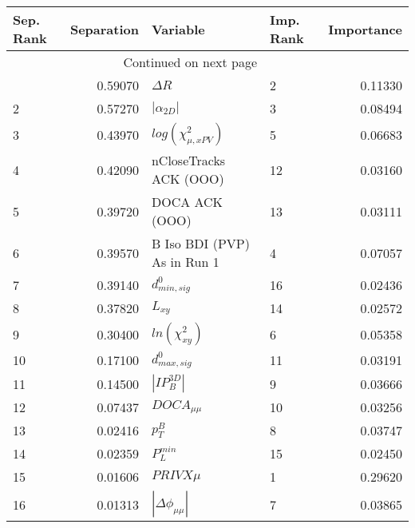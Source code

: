 \usepackage{lscape}

\begin{landscape}
\begin{longtable}{lrllr}
\toprule
Sep. Rank &  Separation &                     Variable & Imp. Rank &  Importance \\
\midrule
\endhead
\midrule
\multicolumn{3}{r}{{Continued on next page}} \\
\midrule
\endfoot

\bottomrule
\endlastfoot
        1 &     0.59070 &                   $\Delta R$ &         2 &     0.11330 \\
        2 &     0.57270 &              $|\alpha_{2D}|$ &         3 &     0.08494 \\
        3 &     0.43970 &    $log(\chi^{2}_{\mu,xPV})$ &         5 &     0.06683 \\
        4 &     0.42090 &       nCloseTracks ACK (OOO) &        12 &     0.03160 \\
        5 &     0.39720 &               DOCA ACK (OOO) &        13 &     0.03111 \\
        6 &     0.39570 &  B Iso BDI (PVP) As in Run 1 &         4 &     0.07057 \\
        7 &     0.39140 &             $d^0_{min, sig}$ &        16 &     0.02436 \\
        8 &     0.37820 &                     $L_{xy}$ &        14 &     0.02572 \\
        9 &     0.30400 &          $ln(\chi^{2}_{xy})$ &         6 &     0.05358 \\
       10 &     0.17100 &             $d^0_{max, sig}$ &        11 &     0.03191 \\
       11 &     0.14500 &              $|IP_{B}^{3D}|$ &         9 &     0.03666 \\
       12 &     0.07437 &              $DOCA_{\mu\mu}$ &        10 &     0.03256 \\
       13 &     0.02416 &                    $p^B_{T}$ &         8 &     0.03747 \\
       14 &     0.02359 &                $P^{min}_{L}$ &        15 &     0.02450 \\
       15 &     0.01606 &                   $PRIVX\mu$ &         1 &     0.29620 \\
       16 &     0.01313 &     $|\Delta \phi_{\mu\mu}|$ &         7 &     0.03865 \\
\end{longtable}

\end{landscape}
